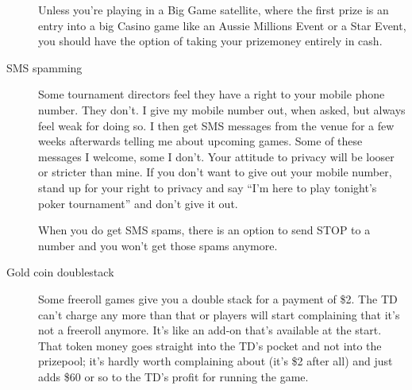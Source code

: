 \begin{description}
Unless you're playing in a Big Game satellite, where the first prize
is an entry into a big Casino game like an Aussie Millions Event or a
Star Event, you should have the option of taking your prizemoney
entirely in cash.

\item[SMS spamming] Some tournament directors feel they have a
right to your mobile phone number. They don't.
I give my mobile number out, when asked, but always feel weak
for doing so. I then get SMS messages from the venue
for a few weeks afterwards telling me about upcoming games. Some of
these messages I welcome, some I don't. Your attitude to privacy will
be looser or stricter than mine. If you don't want to give out your
mobile number, stand up for your right to privacy and say ``I'm here
to play tonight's poker tournament'' and don't give it out.

When you do get SMS spams, there is an option to send STOP to a number
and you won't get those spams anymore.



\item[Gold coin doublestack] Some freeroll games give you a double stack
for a payment of \$2. The TD can't charge any more than that or
players will start complaining that it's not a freeroll anymore.
It's like an add-on that's available at the start. That token
money goes straight into the TD's pocket and not into the prizepool;
it's hardly worth complaining about (it's \$2 after all) and just adds
\$60 or so to the TD's profit for running the game.


\end{description}
